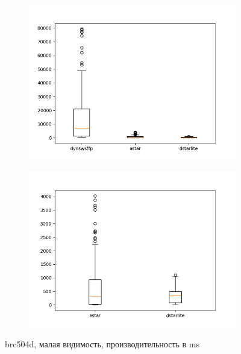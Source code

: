 \documentclass[11pt]{article}
\begin{document}
    \begin{figure}
        \centering
        \begin{subfigure}[b]{0.48\textwidth}
            \centering
            \includegraphics[width=\textwidth]{../plots/r5/brc504d-('dynswsffp', 'astar', 'dstarlite').png}
        \end{subfigure}
        \hfill
        \begin{subfigure}[b]{0.48\textwidth}
            \centering
            \includegraphics[width=\textwidth]{../plots/r5/brc504d-('astar', 'dstarlite').png}
        \end{subfigure}
        \caption{brc504d, малая видимость, производительность в ms}
        \label{fig: brc504d-r5}

    \end{figure}
\end{document}
